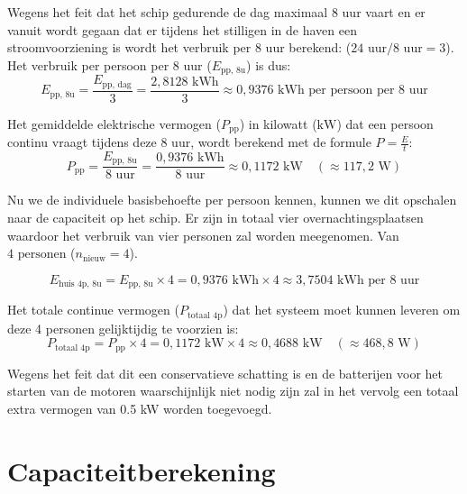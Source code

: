 \noindent Wegens het feit dat het schip gedurende de dag maximaal 8 uur vaart en er vanuit wordt gegaan dat er tijdens het stilligen in de haven een stroomvoorziening is wordt het verbruik per 8 uur berekend: ($24 \text{ uur} / 8 \text{ uur} = 3$). Het verbruik per persoon per 8 uur ($E_{\text{pp, 8u}}$) is dus:
\begin{equation}
E_{\text{pp, 8u}} = \frac{E_{\text{pp, dag}}}{3} = \frac{2{,}8128 \text{ kWh}}{3} \approx 0{,}9376 \text{ kWh per persoon per 8 uur}
\end{equation}

\noindent Het gemiddelde elektrische vermogen ($P_{\text{pp}}$) in kilowatt ($\text{kW}$) dat een persoon continu vraagt tijdens deze 8 uur, wordt berekend met de formule $P = \frac{E}{t}$:
\begin{equation}
P_{\text{pp}} = \frac{E_{\text{pp, 8u}}}{8 \text{ uur}} = \frac{0{,}9376 \text{ kWh}}{8 \text{ uur}} \approx 0{,}1172 \text{ kW} \quad (\approx 117{,}2 \text{ W})
\end{equation}

\noindent Nu we de individuele basisbehoefte per persoon kennen, kunnen we dit opschalen naar de  capaciteit op het schip. Er zijn in totaal vier overnachtingsplaatsen waardoor het verbruik van vier personen zal worden meegenomen. Van $4 \text{ personen}$ ($n_{\text{nieuw}} = 4$).

\begin{equation}
E_{\text{huis 4p, 8u}} = E_{\text{pp, 8u}} \times 4 = 0{,}9376 \text{ kWh} \times 4 \approx 3{,}7504 \text{ kWh per 8 uur}
\end{equation}

\noindent Het totale continue vermogen ($P_{\text{totaal 4p}}$) dat het systeem moet kunnen leveren om deze 4 personen gelijktijdig te voorzien is:
\begin{equation}
P_{\text{totaal 4p}} = P_{\text{pp}} \times 4 = 0{,}1172 \text{ kW} \times 4 \approx 0{,}4688 \text{ kW} \quad (\approx 468{,}8 \text{ W})
\end{equation}

\noindent Wegens het feit dat dit een conservatieve schatting is en de batterijen voor het starten van de motoren waarschijnlijk niet nodig zijn zal in het vervolg een totaal extra vermogen van 0.5 kW worden toegevoegd.

\section*{Capaciteitberekening}

